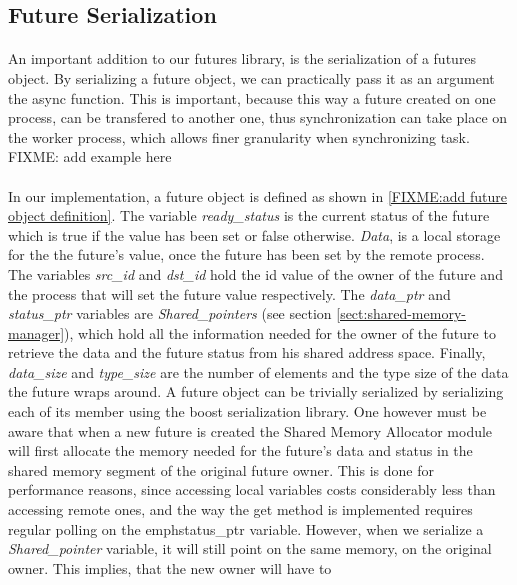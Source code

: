 \subsection{Future Serialization}
\paragraph{}
An important addition to our futures library, is the serialization of a futures object.  By serializing a future
object, we can practically pass it as an argument the async function.  This is important, because this way
a future created on one process, can be transfered to another one, thus synchronization can take place on the 
worker process, which allows finer granularity when synchronizing task.  FIXME: add example here

\paragraph{}
In our implementation, a future object is defined as shown in \ref{FIXME:add future object definition}.
The variable \emph{ready\_status} is the current
status of the future which is true if the value has been set or false otherwise.  \emph{Data}, is a local storage for the
the future's value, once the future has been set by the remote process.  The variables \emph{src\_id} and \emph{dst\_id}
hold the id value of the owner of the future and the process that will set the future value respectively.  
The \emph{data\_ptr} and \emph{status\_ptr} variables are \emph{Shared\_pointers} (see section \ref{sect:shared-memory-manager}),
which hold all the
information needed for the owner of the future to retrieve the data and the future status from his shared address space. 
Finally, \emph{data\_size} and \emph{type\_size} are the number of elements and the
type size of the data the future wraps around.  A future object can be trivially serialized by serializing each
of its member using the boost serialization library.  One however must be aware that when a new future is created
the Shared Memory Allocator module will first allocate the memory needed for the future's data and status in the 
shared memory segment of the original future owner.  This is done for performance reasons, since accessing local
variables costs considerably less than accessing remote ones, and the way the get method is implemented requires 
regular polling on the emph{status\_ptr} variable.  However, when we serialize a \emph{Shared\_pointer} variable,
it will still point on the same memory, on the original owner.  This implies, that the new owner will have to 
